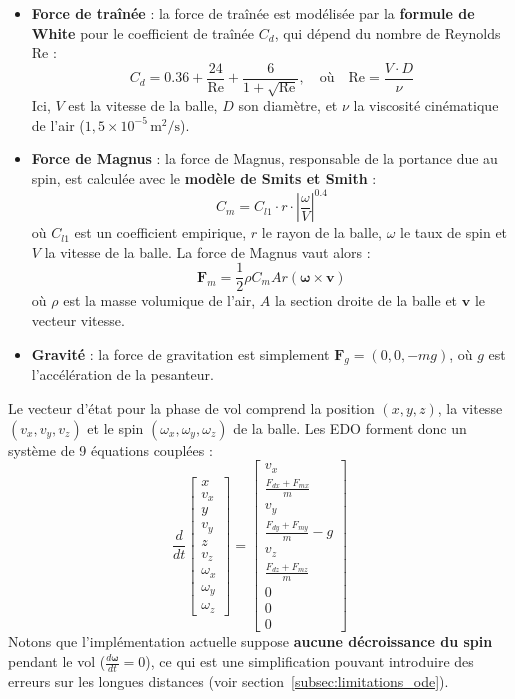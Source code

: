 \documentclass[10pt,a4paper]{report}
\begin{document}
\begin{itemize}
    \item \textbf{Force de traînée} : la force de traînée est modélisée par la \textbf{formule de White} pour le coefficient de traînée \( C_d \), qui dépend du nombre de Reynolds \( \text{Re} \) :
    \[
    C_d = 0.36 + \frac{24}{\text{Re}} + \frac{6}{1 + \sqrt{\text{Re}}}, \quad \text{où} \quad \text{Re} = \frac{V \cdot D}{\nu}
    \]
    Ici, \( V \) est la vitesse de la balle, \( D \) son diamètre, et \( \nu \) la viscosité cinématique de l'air (\( 1{,}5 \times 10^{-5} \, \text{m}^2/\text{s} \)).

    \item \textbf{Force de Magnus} : la force de Magnus, responsable de la portance due au spin, est calculée avec le \textbf{modèle de Smits et Smith} \cite{smits1994aerodynamic} :
    \[
    C_m = C_{l1} \cdot r \cdot \left| \frac{\omega}{V} \right|^{0.4}
    \]
    où \( C_{l1} \) est un coefficient empirique, \( r \) le rayon de la balle, \( \omega \) le taux de spin et \( V \) la vitesse de la balle. La force de Magnus vaut alors :
    \[
    \mathbf{F}_m = \frac{1}{2} \rho C_m A r (\boldsymbol{\omega} \times \mathbf{v})
    \]
    où \( \rho \) est la masse volumique de l'air, \( A \) la section droite de la balle et \( \mathbf{v} \) le vecteur vitesse.

    \item \textbf{Gravité} : la force de gravitation est simplement \( \mathbf{F}_g = (0, 0, -mg) \), où \( g \) est l'accélération de la pesanteur.
\end{itemize}

Le vecteur d'état pour la phase de vol comprend la position \((x, y, z)\), la vitesse \((v_x, v_y, v_z)\) et le spin \((\omega_x, \omega_y, \omega_z)\) de la balle. Les EDO forment donc un système de 9 équations couplées :
\[
\frac{d}{dt}
\begin{bmatrix}
x \\ v_x \\ y \\ v_y \\ z \\ v_z \\ \omega_x \\ \omega_y \\ \omega_z
\end{bmatrix}
=
\begin{bmatrix}
v_x \\
\frac{F_{dx} + F_{mx}}{m} \\
v_y \\
\frac{F_{dy} + F_{my}}{m} - g \\
v_z \\
\frac{F_{dz} + F_{mz}}{m} \\
0 \\
0 \\
0
\end{bmatrix}
\]
Notons que l'implémentation actuelle suppose \textbf{aucune décroissance du spin} pendant le vol (\( \frac{d\boldsymbol{\omega}}{dt} = 0 \)), ce qui est une simplification pouvant introduire des erreurs sur les longues distances (voir section~\ref{subsec:limitations_ode}).
\end{document}
